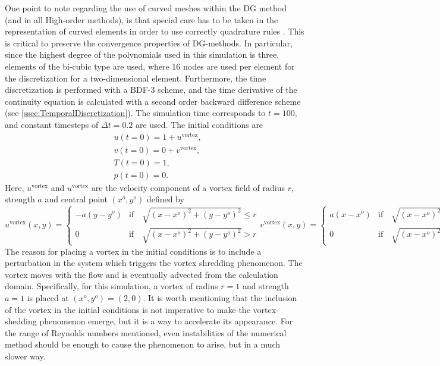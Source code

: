 One point to note regarding the use of curved meshes within the DG method (and in all High-order methods), is that special care has to be taken in the representation of curved elements in order to use correctly quadrature rules \parencite{bassiHighOrderAccurateDiscontinuous1997}. This is critical to preserve the convergence properties of DG-methods. In particular, since the highest degree of the polynomials used in this simulation is three, elements of the bi-cubic type are used, where 16 nodes are used per element for the discretization for a two-dimensional element. Furthermore, the time discretization is performed with a BDF-3 scheme, and the time derivative of the continuity equation is calculated with a second order backward difference scheme (see \cref{ssec:TemporalDiscretization}). The simulation time corresponds to $t= 100$, and constant timesteps of $\Delta t = 0.2$ are used. The initial conditions are
\begin{subequations} 
\begin{align}
&u(t=0) = 1 + u^{\text{vortex}},  \\
&v(t=0) = 0 + v^{\text{vortex}},  \\
&T(t=0) = 1,\\
&p(t=0) = 0.
\end{align}
\end{subequations}
Here, $u^{\text{vortex}}$ and $u^{\text{vortex}}$ are the velocity component of a vortex field of radius $r$, strength $a$  and central point $(x^o,y^o)$ defined by 
{
\begin{subequations}
\begin{equation}
	u^{\text{vortex}}(x,y) = 
	\begin{cases}
		-a(y-y^o) & \text{if} \quad\sqrt{(x-x^o)^2+(y-y^o)^2} \leq r \\
		0 & \text{if} \quad\sqrt{(x-x^o)^2+(y-y^o)^2} > r
	\end{cases}
\end{equation}\label{eq:VortexU}
\begin{equation}
	v^{\text{vortex}}(x,y) = 
	\begin{cases}
		a(x-x^o) & \text{if} \quad\sqrt{(x-x^o)^2+(y-y^o)^2} \leq r \\
		0 & \text{if} \quad\sqrt{(x-x^o)^2+(y-y^o)^2} > r
	\end{cases}
\end{equation}	\label{eq:VortexV}
\end{subequations}
}%
The reason for placing a vortex in the initial conditions is to include a perturbation in the system which triggers the vortex shredding phenomenon. The vortex moves with the flow and is eventually advected from the calculation domain. Specifically, for this simulation, a vortex of radius $r=1$ and strength $a = 1$ is placed at $(x^o,y^o) = ( 2,0)$. It is worth mentioning that the inclusion of the vortex in the initial conditions is not imperative to make the vortex-shedding phenomenon emerge, but it is a way to accelerate its appearance. For the range of Reynolds numbers mentioned, even instabilities of the numerical method should be enough to cause the phenomenon to arise, but in a much slower way. 

